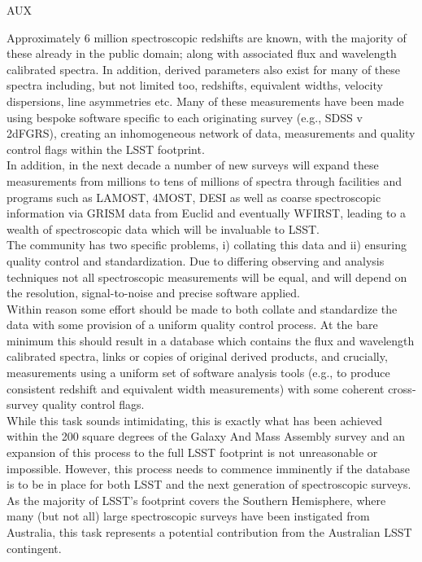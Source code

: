 {\begin{tasklist}{AUX}
\begin{task}
{\begin{enumerate}
\end{enumerate}
Approximately 6 million spectroscopic redshifts are known, with the majority of these already in the public domain; along with associated flux and wavelength calibrated spectra. In addition, derived parameters also exist for many of these spectra including, but not limited too, redshifts, equivalent widths, velocity dispersions, line asymmetries etc. Many of these measurements have been made using bespoke software specific to each originating survey (e.g., SDSS v 2dFGRS), creating an inhomogeneous network of data, measurements and quality control flags within the LSST footprint.
\\
In addition, in the next decade a number of new surveys will expand these measurements from millions to tens of millions of spectra through facilities and programs such as LAMOST, 4MOST, DESI as well as coarse spectroscopic information via GRISM data from Euclid and eventually WFIRST, leading to a wealth of spectroscopic data which will be invaluable to LSST.
\\
The community has two specific problems, i) collating this data and ii) ensuring quality control and standardization. Due to differing observing and analysis techniques not all spectroscopic measurements will be equal, and will depend on the resolution, signal-to-noise and precise software applied.
\\
Within reason some effort should be made to both collate and standardize the data with some provision of a uniform quality control process. At the bare minimum this should result in a database which contains the flux and wavelength calibrated spectra, links or copies of original derived products, and crucially, measurements using a uniform set of software analysis tools (e.g., to produce consistent redshift and equivalent width measurements) with some coherent cross-survey quality control flags.
\\
While this task sounds intimidating, this is exactly what has been achieved within the 200 square degrees of the Galaxy And Mass Assembly survey \citep{driver2011a,driver2016a,liske2015a} and an expansion of this process to the full LSST footprint is not unreasonable or impossible. However, this process needs to commence imminently if the database is to be in place for both LSST and the next generation of spectroscopic surveys.
\\
As the majority of LSST's footprint covers the Southern Hemisphere, where many (but not all) large spectroscopic surveys have been instigated from Australia, this task represents a potential contribution from the Australian LSST contingent.
}
\end{task}
\end{tasklist}}
